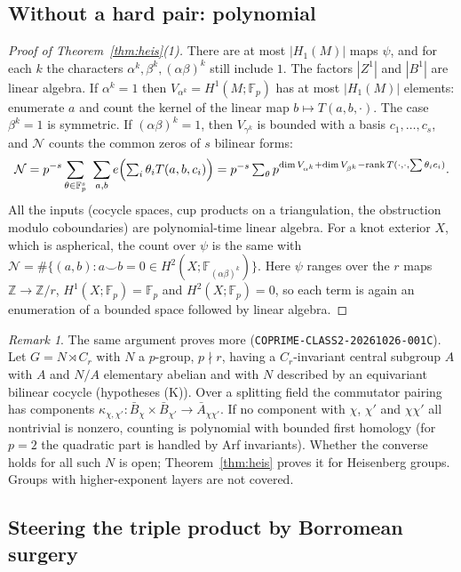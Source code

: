 \documentclass[11pt]{article}
\theoremstyle{definition}
\theoremstyle{remark}
\newtheorem{remark}[theorem]{Remark}
\newcommand{\F}{\mathbb{F}}
\newcommand{\Z}{\mathbb{Z}}
\newcommand{\cN}{\mathcal{N}}
\begin{document}
\subsection{Without a hard pair: polynomial}

\begin{proof}[Proof of Theorem~\ref{thm:heis}(1)]
There are at most $|H_1(M)|$ maps $\psi$, and for each $k$ the characters
$\alpha^k,\beta^k,(\alpha\beta)^k$ still include $1$. The factors $|Z^1|$ and
$|B^1|$ are linear algebra. If $\alpha^k=1$ then $V_{\alpha^k}=H^1(M;\F_p)$ has
at most $|H_1(M)|$ elements: enumerate $a$ and count the kernel of the linear
map $b\mapsto T(a,b,\cdot)$. The case $\beta^k=1$ is symmetric. If
$(\alpha\beta)^k=1$, then $V_{\gamma^k}$ is bounded with a basis
$c_1,\dots,c_s$, and $\cN$ counts the common zeros of $s$ bilinear forms:
\[
\cN=p^{-s}\sum_{\theta\in\F_p^s}\ \sum_{a,b}e\Bigl(\textstyle\sum_i\theta_iT(a,b,c_i)\Bigr)
=p^{-s}\sum_{\theta}p^{\dim V_{\alpha^k}+\dim V_{\beta^k}-\operatorname{rank}T(\cdot,\cdot,\sum\theta_ic_i)}.
\]
All the inputs (cocycle spaces, cup products on a triangulation, the
obstruction modulo coboundaries) are polynomial-time linear algebra. For a
knot exterior $X$, which is aspherical, the count over $\psi$ is the same with
$\cN=\#\{(a,b):a\smile b=0\in H^2(X;\F_{(\alpha\beta)^k})\}$. Here $\psi$
ranges over the $r$ maps $\Z\to\Z/r$, $H^1(X;\F_p)=\F_p$ and $H^2(X;\F_p)=0$,
so each term is again an enumeration of a bounded space followed by linear
algebra.
\end{proof}

\begin{remark}\label{rem:K}
The same argument proves more (\texttt{COPRIME-CLASS2-20261026-001C}). Let
$G=N\rtimes C_r$ with $N$ a $p$-group, $p\nmid r$, having a $C_r$-invariant
central subgroup $A$ with $A$ and $N/A$ elementary abelian and with
$N$ described by an equivariant bilinear cocycle (hypotheses (K)). Over a
splitting field the commutator pairing has components
$\kappa_{\chi,\chi'}\colon\bar B_\chi\times\bar B_{\chi'}\to\bar
A_{\chi\chi'}$. If no component with $\chi$, $\chi'$ and $\chi\chi'$ all
nontrivial is nonzero, counting is polynomial with bounded first homology
(for $p=2$ the quadratic part is handled by Arf invariants). Whether the
converse holds for all such $N$ is open; Theorem~\ref{thm:heis} proves it for
Heisenberg groups. Groups with higher-exponent layers are not covered.
\end{remark}

\subsection{Steering the triple product by Borromean surgery}
\end{document}
